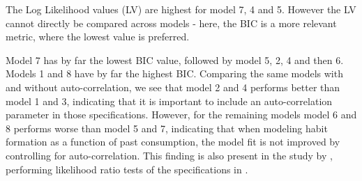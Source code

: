 The Log Likelihood values (LV) are highest for model 7, 4 and 5. However the LV cannot directly be compared across models - here, the BIC is a more relevant metric, where the lowest value is preferred.  

Model 7 has by far the lowest BIC value, followed by model 5, 2, 4 and then 6. Models 1 and 8 have by far the highest BIC. Comparing the same models with and without auto-correlation, we see that model 2 and 4 performs better than model 1 and 3, indicating that it is important to include an auto-correlation parameter in those specifications. However, for the remaining models model 6 and 8 performs worse than model 5 and 7, indicating that when modeling habit formation as a function of past consumption, the model fit is not improved by controlling for auto-correlation. This finding is also present in the study by \cite{testing_les}, performing likelihood ratio tests of the specifications in \cite{pollak1969estimation}.

